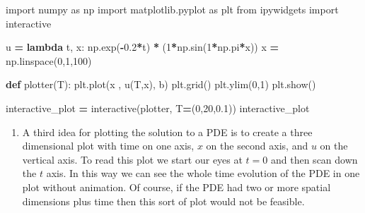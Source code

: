 \documentclass[
]{book}
\newenvironment{Shaded}{\begin{snugshade}}{\end{snugshade}}
\newcommand{\DecValTok}[1]{\textcolor[rgb]{0.00,0.00,0.81}{#1}}
\newcommand{\FloatTok}[1]{\textcolor[rgb]{0.00,0.00,0.81}{#1}}
\newcommand{\ImportTok}[1]{#1}
\newcommand{\KeywordTok}[1]{\textcolor[rgb]{0.13,0.29,0.53}{\textbf{#1}}}
\newcommand{\NormalTok}[1]{#1}
\newcommand{\OperatorTok}[1]{\textcolor[rgb]{0.81,0.36,0.00}{\textbf{#1}}}
\newcommand{\StringTok}[1]{\textcolor[rgb]{0.31,0.60,0.02}{#1}}
\providecommand{\tightlist}{%
  \setlength{\itemsep}{0pt}\setlength{\parskip}{0pt}}
\theoremstyle{definition}
\theoremstyle{definition}
\theoremstyle{definition}
\theoremstyle{remark}
\begin{document}
\begin{Shaded}
\begin{Highlighting}[]
\ImportTok{import}\NormalTok{ numpy }\ImportTok{as}\NormalTok{ np}
\ImportTok{import}\NormalTok{ matplotlib.pyplot }\ImportTok{as}\NormalTok{ plt}
\ImportTok{from}\NormalTok{ ipywidgets }\ImportTok{import}\NormalTok{ interactive}

\NormalTok{u }\OperatorTok{=} \KeywordTok{lambda}\NormalTok{ t, x: np.exp(}\OperatorTok{{-}}\FloatTok{0.2}\OperatorTok{*}\NormalTok{t) }\OperatorTok{*}\NormalTok{ (}\DecValTok{1}\OperatorTok{*}\NormalTok{np.sin(}\DecValTok{1}\OperatorTok{*}\NormalTok{np.pi}\OperatorTok{*}\NormalTok{x))}
\NormalTok{x }\OperatorTok{=}\NormalTok{ np.linspace(}\DecValTok{0}\NormalTok{,}\DecValTok{1}\NormalTok{,}\DecValTok{100}\NormalTok{)}

\KeywordTok{def}\NormalTok{ plotter(T):}
\NormalTok{  plt.plot(x , u(T,x), }\StringTok{\textquotesingle{}b\textquotesingle{}}\NormalTok{)}
\NormalTok{  plt.grid()}
\NormalTok{  plt.ylim(}\DecValTok{0}\NormalTok{,}\DecValTok{1}\NormalTok{)}
\NormalTok{  plt.show()}

\NormalTok{interactive\_plot }\OperatorTok{=}\NormalTok{ interactive(plotter, T}\OperatorTok{=}\NormalTok{(}\DecValTok{0}\NormalTok{,}\DecValTok{20}\NormalTok{,}\FloatTok{0.1}\NormalTok{))}
\NormalTok{interactive\_plot}
\end{Highlighting}
\end{Shaded}

\begin{enumerate}
\def\labelenumi{\alph{enumi}.}
\setcounter{enumi}{2}
\tightlist
\item
  A third idea for plotting the solution to a PDE is to create a three dimensional plot with time on one axis, \(x\) on the second axis, and \(u\) on the vertical axis. To read this plot we start our eyes at \(t=0\) and then scan down the \(t\) axis. In this way we can see the whole time evolution of the PDE in one plot without animation. Of course, if the PDE had two or more spatial dimensions plus time then this sort of plot would not be feasible.
\end{enumerate}
\end{document}
